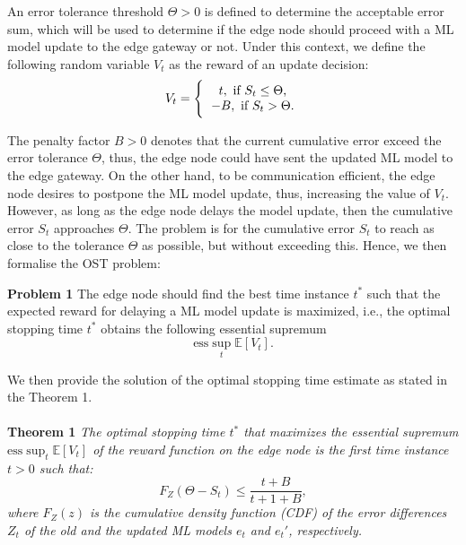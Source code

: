 \documentclass{mpaper}
\begin{document}
An error tolerance threshold $\Theta > 0$ is defined to determine the acceptable error sum, which will be used to determine if the 
edge node should proceed with a ML model update to the edge gateway or not. Under this context, we define the following random variable $V_{t}$ as the reward of an update decision:
\begin{equation}\label{reward}
    V_t = \Bigg\{ \begin{tabular}{c}
                  $t,\ \text{if}\ S_t \leq \Theta$, \\
                  $-B,\ \text{if}\ S_t > \Theta.$
                  \end{tabular}
\end{equation}

The penalty factor $B> 0$ denotes that the current cumulative error exceed the error tolerance $\Theta$, thus, the edge node could have sent the updated ML model to the edge gateway. On the other hand, to be communication efficient, the edge node desires to postpone the ML model update, thus, increasing the value of $V_{t}$. However, as long as the edge node delays the model update, then the cumulative error $S_{t}$ approaches $\Theta$. The problem is for the cumulative error $S_{t}$ to reach as close to the tolerance $\Theta$ as possible, but without exceeding this. Hence, we then formalise the OST problem:

\textbf{Problem 1} The edge node should find the best time instance $t^{*}$ such that the expected reward for delaying a ML model update is maximized, i.e., the optimal stopping time $t^{*}$ obtains the following essential supremum
\[
\mbox{ess} \sup_{t} \mathbb{E}[V_{t}].
\]

We then provide the solution of the optimal stopping time estimate as stated in the Theorem 1.
\\
\\
\textbf{Theorem 1}\textit{
The optimal stopping time $t^{*}$ that maximizes the essential supremum $\mbox{ess} \sup_{t} \mathbb{E}[V_{t}]$ of the reward function on the edge node is the first time instance $t>0$ such that:
\[
F_{Z}(\Theta - S_{t}) \leq \frac{t+B}{t+1+B},
\]
where $F_{Z}(z)$ is the cumulative density function (CDF) of the error differences $Z_{t}$ of the old and the updated ML models $e_{t}$ and $e_{t}'$, respectively.}  
\\

\end{document}

